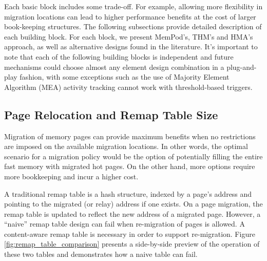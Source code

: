 Each basic block includes some trade-off. For example, allowing more flexibility in migration locations can lead to higher performance benefits at the cost of larger book-keeping structures. The following subsections provide detailed description of each building block. For each block, we present MemPod's, THM's and HMA's approach, as well as alternative designs found in the literature. It's important to note that each of the following building blocks is independent and future mechanisms could choose almost any element design combination in a plug-and-play fashion, with some exceptions such as the use of Majority Element Algorithm (MEA) activity tracking cannot work with threshold-based triggers.

\subsection{Page Relocation and Remap Table Size}
\label{sec:relocation}

Migration of memory pages can provide maximum benefits when no restrictions are imposed on the available migration locations. In other words, the optimal scenario for a migration policy would be the option of potentially filling the entire fast memory with migrated hot pages. On the other hand, more options require more bookkeeping and incur a higher cost.

A traditional remap table is a hash structure, indexed by a page's address and pointing to the migrated (or relay) address if one exists. On a page migration, the remap table is updated to reflect the new address of a migrated page. However, a ``naive'' remap table design can fail when re-migration of pages is allowed. A content-aware remap table is necessary in order to support re-migration. Figure \ref{fig:remap_table_comparison} presents a side-by-side preview of the operation of these two tables and demonstrates how a naive table can fail.

